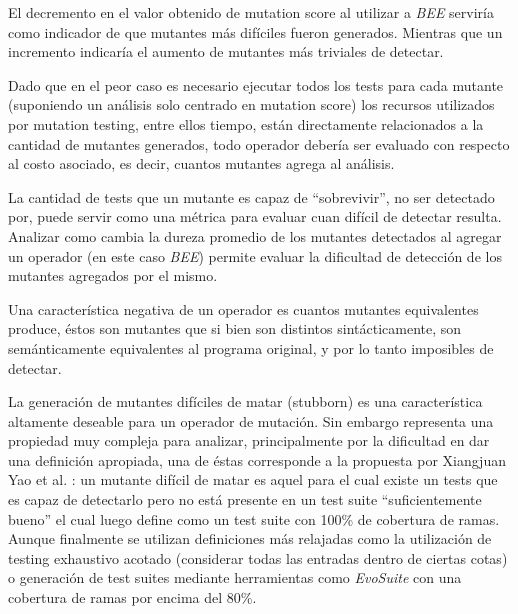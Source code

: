 \begin{description}[leftmargin=8em,style=nextline]
	\item[Mutation score] El decremento en el valor obtenido de mutation score al utilizar a \emph{BEE} servir\'ia como indicador de que mutantes m\'as dif\'iciles fueron generados. Mientras que un incremento indicar\'ia el aumento de mutantes m\'as triviales de detectar.
	\item[Cantidad de mutantes] Dado que en el peor caso es necesario ejecutar todos los tests para cada mutante (suponiendo un an\'alisis solo centrado en mutation score) los recursos utilizados por mutation testing, entre ellos tiempo, est\'an directamente relacionados a la cantidad de mutantes generados, todo operador deber\'ia ser evaluado con respecto al costo asociado, es decir, cuantos mutantes agrega al an\'alisis.
	\item[Dureza (toughness)] La cantidad de tests que un mutante es capaz de ``sobrevivir'', no ser detectado por, puede servir como una m\'etrica para evaluar cuan dif\'icil de detectar resulta. Analizar como cambia la dureza promedio de los mutantes detectados al agregar un operador (en este caso \emph{BEE}) permite evaluar la dificultad de detecci\'on de los mutantes agregados por el mismo.
	\item[Mutantes equivalentes] Una caracter\'istica negativa de un operador es cuantos mutantes equivalentes produce, \'estos son mutantes que si bien son distintos sint\'acticamente, son sem\'anticamente equivalentes al programa original, y por lo tanto imposibles de detectar.
	\item[Mutantes dif\'iciles de matar (stubborn)] La generaci\'on de mutantes dif\'iciles de matar (stubborn) es una caracter\'istica altamente deseable para un operador de mutaci\'on. Sin embargo representa una propiedad muy compleja para analizar, principalmente por la dificultad en dar una definici\'on apropiada, una de \'estas corresponde a la propuesta por Xiangjuan Yao et al. \cite{bibliography.mutation.evaluation.stubborn}: un mutante dif\'icil de matar es aquel para el cual existe un tests que es capaz de detectarlo pero no est\'a presente en un test suite ``suficientemente bueno'' el cual luego define como un test suite con 100\% de cobertura de ramas. Aunque finalmente se utilizan definiciones m\'as relajadas como la utilizaci\'on de testing exhaustivo acotado (considerar todas las entradas dentro de ciertas cotas) o generaci\'on de test suites mediante herramientas como \emph{EvoSuite} con una cobertura de ramas por encima del 80\%.
\end{description}

